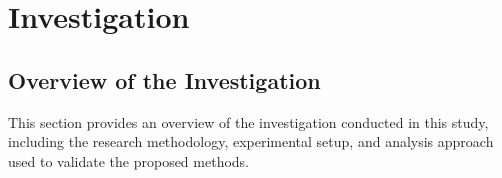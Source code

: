\chapter{Investigation}
\label{chapter4}

\section{Overview of the Investigation}
\begin{paragraph}
This section provides an overview of the investigation conducted in this study, including the research methodology, experimental setup, and analysis approach used to validate the proposed methods.
\end{paragraph}
